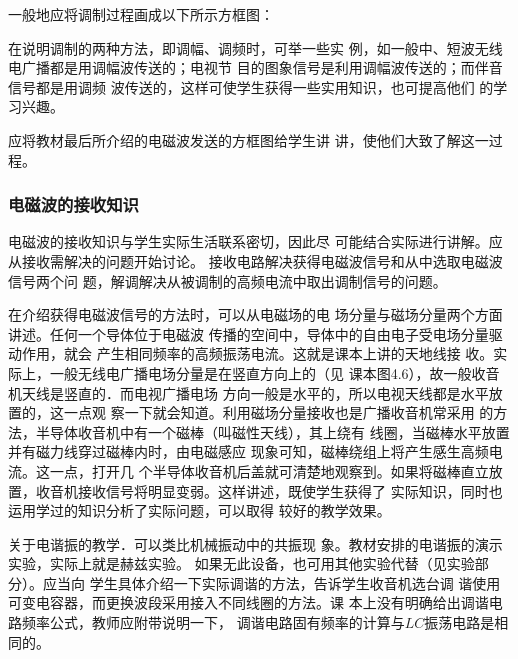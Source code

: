 一般地应将调制过程画成以下所示方框图：
\begin{center}
    \end{center}

在说明调制的两种方法，即调幅、调频时，可举一些实
例，如一般中、短波无线电广播都是用调幅波传送的；电视节
目的图象信号是利用调幅波传送的；而伴音信号都是用调频
波传送的，这样可使学生获得一些实用知识，也可提高他们
的学习兴趣。

应将教材最后所介绍的电磁波发送的方框图给学生讲
讲，使他们大致了解这一过程。

\subsubsection{电磁波的接收知识}

电磁波的接收知识与学生实际生活联系密切，因此尽
可能结合实际进行讲解。应从接收需解决的问题开始讨论。
接收电路解决获得电磁波信号和从中选取电磁波信号两个问
题，解调解决从被调制的高频电流中取出调制信号的问题。

在介绍获得电磁波信号的方法时，可以从电磁场的电
场分量与磁场分量两个方面讲述。任何一个导体位于电磁波
传播的空间中，导体中的自由电子受电场分量驱动作用，就会
产生相同频率的高频振荡电流。这就是课本上讲的天地线接
收。实际上，一般无线电广播电场分量是在竖直方向上的（见
课本图4.6），故一般收音机天线是竖直的．而电视广播电场
方向一般是水平的，所以电视天线都是水平放置的，这一点观
察一下就会知道。利用磁场分量接收也是广播收音机常采用
的方法，半导体收音机中有一个磁棒（叫磁性天线），其上绕有
线圈，当磁棒水平放置并有磁力线穿过磁棒内时，由电磁感应
现象可知，磁棒绕组上将产生感生高频电流。这一点，打开几
个半导体收音机后盖就可清楚地观察到。如果将磁棒直立放
置，收音机接收信号将明显变弱。这样讲述，既使学生获得了
实际知识，同时也运用学过的知识分析了实际问题，可以取得
较好的教学效果。

关于电谐振的教学．可以类比机械振动中的共振现
象。教材安排的电谐振的演示实验，实际上就是赫兹实验。
如果无此设备，也可用其他实验代替（见实验部分）。应当向
学生具体介绍一下实际调谐的方法，告诉学生收音机选台调
谐使用可变电容器，而更换波段采用接入不同线圈的方法。课
本上没有明确给出调谐电路频率公式，教师应附带说明一下，
调谐电路固有频率的计算与$LC$振荡电路是相同的。


